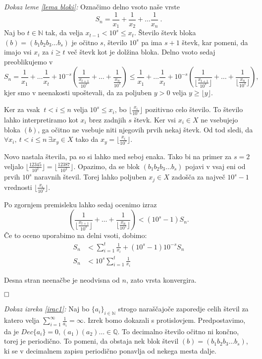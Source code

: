 \documentclass[a4paper,12pt]{article}
\def\N{\mathbb{N}} %
\def\Q{\mathbb{Q}} %
\def\qed{$\hfill\Box$}   %
\begin{document}

\noindent
{\em Dokaz leme \ref{lema bloki}:\/} Označimo delno vsoto naše vrste 
\[ S_n = \frac{1}{x_1} + \frac{1}{x_2} + \dots \frac{1}{x_n} \ . \]
Naj bo $t \in \N $ tak, da velja $x_{t-1} < 10^s \leq x_t$. Število števk bloka $(b) = (b_1b_2b_3 \dots b_s)$
je očitno $s$, število $10^s$ pa ima $s+1$ števk, kar pomeni, da imajo vsi $x_i$ za $i \geq t$
več števk kot je dolžina bloka. Delno vsoto sedaj preoblikujemo v
\[ S_n = \frac{1}{x_1} + \dots \frac{1}{x_t} + 10^{-s}(\frac{1}{\frac{x_{t + 1}}{10^s}} + \dots + \frac{1}{\frac{x_n}{10^s}})
    \leq \frac{1}{x_1} + \dots \frac{1}{x_t} + 10^{-s}(\frac{1}{ \lfloor\frac{x_{t + 1}}{10^s}\rfloor} + \dots + \frac{1}{\lfloor\frac{x_n}{10^s}\rfloor}) ,
\]
kjer smo v neenakosti upoštevali, da za poljuben $y > 0$ velja $y \geq \lfloor y \rfloor$.

Ker za vsak $\ t < i \leq n$ velja $10^s \leq x_i$, bo $\lfloor \frac{x_i}{10^s} \rfloor$ pozitivno celo število.
To število lahko interpretiramo kot $x_i$ brez zadnjih $s$ števk. Ker vsi $x_i \in X$
ne vsebujejo bloka $(b)$, ga očitno ne vsebuje niti njegovih prvih nekaj števk. Od tod sledi, da 
$ \forall x_i, \ t < i \leq n \ \exists x_y \in X$ tako da $ x_y = \lfloor \frac{x_i}{10^s} \rfloor$.

Novo nastala števila, pa so si lahko med seboj enaka. Tako bi na primer za $s=2$ veljalo 
$ \lfloor\frac{12345}{10^2}\rfloor = \lfloor \frac{12387}{10^2}\rfloor$.
Opazimo, da se blok $(b_1b_2b_3 \dots b_s)$ pojavi v vsaj eni od prvih $10^s$ naravnih števil.
Torej lahko poljuben $x_j \in X$ zadošča za največ $10^s - 1$ vrednosti $\lfloor \frac{x_i}{10^s} \rfloor$.

Po zgornjem premisleku lahko sedaj ocenimo izraz 
\[(\frac{1}{ \lfloor\frac{x_{t + 1}}{10^s}\rfloor} + \dots + \frac{1}{\lfloor\frac{x_n}{10^s}\rfloor}) < (10^s - 1)S_n.\]
Če to oceno uporabimo na delni vsoti, dobimo:
\[
    \begin{split}
    S_n &< \sum_{i=1}^t \frac{1}{x_i} + (10^s - 1)10^{-s}S_n \\
    S_n &< 10^s \sum_{i=1}^t \frac{1}{x_i}
    \end{split}
    \]

Desna stran neenačbe je neodvisna od $n$, zato vrsta konvergira.

\qed

\noindent
{\em Dokaz izreka \ref{irac1}:\/} Naj bo $\{a_i\}_{i\in \N}$ strogo naraščajoče zaporedje
celih števil za katero velja $\sum_{i=1}^{\infty}\frac{1}{a_i} = \infty$. Izrek bomo dokazali
s protislovjem. Predpostavimo, da je $Dec\{a_i\} = 0,(a_1)(a_2) \dots \in \Q$. To decimalno
število očitno ni končno, torej je periodično. 
To pomeni, da obstaja nek blok števil $(b) = (b_1b_2b_3 \dots b_s)$,
ki se v decimalnem zapisu periodično ponavlja od nekega mesta dalje. 
\end{document}

